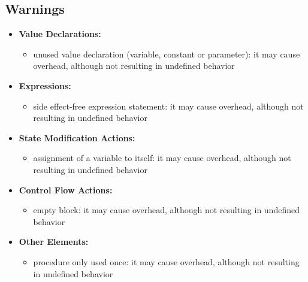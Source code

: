 \subsection{Warnings}
\begin{itemize}
	\item \textbf{Value Declarations:}
	\begin{itemize}
		\item unused value declaration (variable, constant or parameter): it may cause overhead, although not resulting in undefined behavior
	\end{itemize}
	\item \textbf{Expressions:}
	\begin{itemize}
		\item side effect-free expression statement: it may cause overhead, although not resulting in undefined behavior
	\end{itemize}
	\item \textbf{State Modification Actions:}
	\begin{itemize}
		\item assignment of a variable to itself: it may cause overhead, although not resulting in undefined behavior
	\end{itemize}
	\item \textbf{Control Flow Actions:}
	\begin{itemize}
		\item empty block: it may cause overhead, although not resulting in undefined behavior
	\end{itemize}
	\item \textbf{Other Elements:}
	\begin{itemize}
		\item procedure only used once: it may cause overhead, although not resulting in undefined behavior
	\end{itemize}
\end{itemize}

